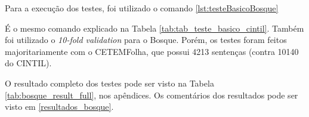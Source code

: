Para a execução dos testes, foi utilizado o comando \ref{lst:testeBasicoBosque}
\begin{center}
    
\end{center}
É o mesmo comando explicado na Tabela \ref{tab:tab_teste_basico_cintil}. Também foi utilizado o \textit{10-fold validation} para o Bosque. Porém, os testes foram feitos majoritariamente com o CETEMFolha, que possui 4213 sentenças (contra 10140 do CINTIL).

O resultado completo dos testes pode ser visto na Tabela \ref{tab:bosque_result_full}, nos apêndices. Os comentários dos resultados pode ser visto em \ref{resultados_bosque}.
